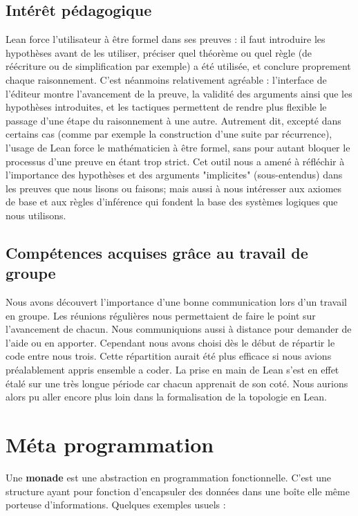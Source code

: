 \documentclass[a4paper, 12pt]{article}
\begin{document}
\begin{itemize}
\subsection{Intérêt pédagogique}

Lean force l'utilisateur à être formel dans ses preuves : il faut introduire les hypothèses avant de les utiliser, préciser quel théorème ou quel règle (de réécriture ou de simplification par exemple) a été utilisée, et conclure proprement chaque raisonnement. C'est néanmoins relativement agréable : l'interface de l'éditeur montre l'avancement de la preuve, la validité des arguments ainsi que les hypothèses introduites, et les tactiques permettent de rendre plus flexible le passage d'une étape du raisonnement à une autre. Autrement dit, excepté dans certains cas (comme par exemple la construction d'une suite par récurrence), l'usage de Lean force le mathématicien à être formel, sans pour autant bloquer le processus d'une preuve en étant trop strict. Cet outil nous a amené à réfléchir à l'importance des hypothèses et des arguments "implicites" (sous-entendus) dans les preuves que nous lisons ou faisons; mais aussi à nous intéresser aux axiomes de base et aux règles d'inférence qui fondent la base des systèmes logiques que nous utilisons.


\subsection{Compétences acquises grâce au travail de groupe}

Nous avons découvert l’importance d’une bonne communication lors d’un travail en groupe. Les réunions régulières nous permettaient de faire le point sur l’avancement de chacun. Nous communiquions aussi à distance pour demander de l’aide ou en apporter. Cependant nous avons choisi dès le début de répartir le code entre nous trois. Cette répartition aurait été plus efficace si nous avions préalablement appris ensemble a coder. La prise en main de Lean s’est en effet étalé sur une très longue période car chacun apprenait de son coté. Nous aurions alors pu aller encore plus loin dans la formalisation de la topologie en Lean.

\newpage

\appendix

\section{Méta programmation}

Une \textbf{monade} est une abstraction en programmation fonctionnelle. C'est une structure ayant pour fonction d'encapsuler des données dans une boîte elle même porteuse d'informations. Quelques exemples usuels :


\end{itemize}
\end{document}
